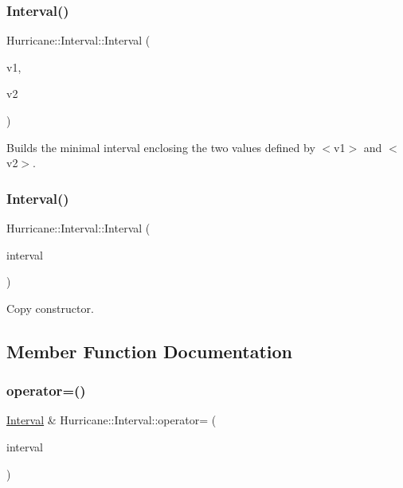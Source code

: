 \subsubsection{\texorpdfstring{Interval()}{Interval()}\hspace{0.1cm}{\footnotesize\ttfamily [3/4]}}
{\footnotesize\ttfamily Hurricane\+::\+Interval\+::\+Interval (\begin{DoxyParamCaption}\item[{const \hyperlink{group__DbUGroup_ga4fbfa3e8c89347af76c9628ea06c4146}{Db\+U\+::\+Unit} \&}]{v1,  }\item[{const \hyperlink{group__DbUGroup_ga4fbfa3e8c89347af76c9628ea06c4146}{Db\+U\+::\+Unit} \&}]{v2 }\end{DoxyParamCaption})}

Builds the minimal interval enclosing the two values defined by {\ttfamily $<$v1$>$} and {\ttfamily $<$v2$>$}. \mbox{\label{classHurricane_1_1Interval_af1d588fcfe919e45be4334fdbd8a07a6}} 
\subsubsection{\texorpdfstring{Interval()}{Interval()}\hspace{0.1cm}{\footnotesize\ttfamily [4/4]}}
{\footnotesize\ttfamily Hurricane\+::\+Interval\+::\+Interval (\begin{DoxyParamCaption}\item[{const \hyperlink{classHurricane_1_1Interval}{Interval} \&}]{interval }\end{DoxyParamCaption})}

Copy constructor. 

\subsection{Member Function Documentation}
\mbox{\label{classHurricane_1_1Interval_a6d9eb898fa89218cec031f28d69a7d95}} 
\subsubsection{\texorpdfstring{operator=()}{operator=()}}
{\footnotesize\ttfamily \hyperlink{classHurricane_1_1Interval}{Interval} \& Hurricane\+::\+Interval\+::operator= (\begin{DoxyParamCaption}\item[{const \hyperlink{classHurricane_1_1Interval}{Interval} \&}]{interval }\end{DoxyParamCaption})}

